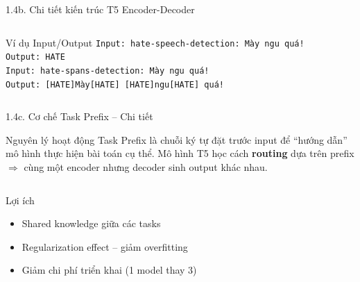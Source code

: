 \documentclass[11pt, aspectratio=169]{beamer}
\begin{document}
\begin{frame}[fragile, shrink=10]{1.4b. Chi tiết kiến trúc T5 Encoder-Decoder}
\begin{columns}[T]
  \vspace{0.2cm}
  \begin{block}{Ví dụ Input/Output}
    \scriptsize
    \texttt{Input: hate-speech-detection: Mày ngu quá!}\\
    \texttt{Output: HATE}\\[0.2em]
    \texttt{Input: hate-spans-detection: Mày ngu quá!}\\
    \texttt{Output: [HATE]Mày[HATE] [HATE]ngu[HATE] quá!}
  \end{block}
\end{columns}
\end{frame}

\begin{frame}[fragile, shrink=30]{1.4c. Cơ chế Task Prefix -- Chi tiết}

\begin{block}{Nguyên lý hoạt động}
  Task Prefix là chuỗi ký tự đặt trước input để ``hướng dẫn'' mô hình thực hiện bài toán cụ thể.
  Mô hình T5 học cách \textbf{routing} dựa trên prefix $\Rightarrow$ cùng một encoder nhưng decoder sinh output khác nhau.
\end{block}

\vspace{0.2cm}
\centering
{}

\vspace{0.3cm}
\begin{columns}[T]
  \begin{block}{Lợi ích}
    \begin{itemize}
      \item Shared knowledge giữa các tasks
      \item Regularization effect -- giảm overfitting
      \item Giảm chi phí triển khai (1 model thay 3)
    \end{itemize}
  \end{block}


\end{columns}
\end{frame}
\end{document}
